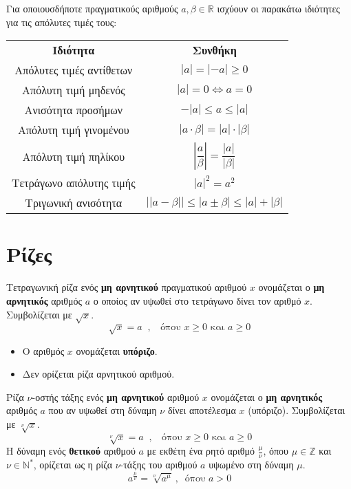 \thewrhmata
{}
Για οποιουσδήποτε πραγματικούς αριθμούς $ a,\beta\in\mathbb{R} $ ισχύουν οι παρακάτω ιδιότητες για τις απόλυτες τιμές τους:
\begin{center}
\begin{longtable}{cc}
\hline \rule[-2ex]{0pt}{5.5ex} \textbf{Ιδιότητα} & \textbf{Συνθήκη} \\
\hhline{==}\rule[-2ex]{0pt}{5.5ex} Απόλυτες τιμές αντίθετων & $ |a|=|-a|\geq0 $ \\
\rule[-2ex]{0pt}{5.5ex}  Απόλυτη τιμή μηδενός & $ |a|=0\Leftrightarrow a=0 $\\
\rule[-2ex]{0pt}{5.5ex}  Ανισότητα προσήμων & $ -|a|\leq a\leq|a| $ \\
\rule[-2ex]{0pt}{5.5ex}  Απόλυτη τιμή γινομένου & $ |a\cdot\beta|=|a|\cdot|\beta| $ \\
\rule[-2ex]{0pt}{5.5ex}  Απόλυτη τιμή πηλίκου & $ \left| \dfrac{a}{\beta}\right|=\dfrac{|a|}{|\beta|} $ \\
\rule[-2ex]{0pt}{5.5ex} Τετράγωνο απόλυτης τιμής & $ |a|^2=a^2 $ \\ 
\rule[-2ex]{0pt}{5.5ex} Τριγωνική ανισότητα & $ \left||a-\beta| \right|\leq|a\pm\beta|\leq|a|+|\beta|  $ \\
\hline
\end{longtable}\vspace{-4mm}
\end{center}
\Lymena
\section{Ρίζες}
\Thewria
\orismoi
{}
Τετραγωνική ρίζα ενός \textbf{μη αρνητικού} πραγματικού αριθμού $ x $ ονομάζεται ο \textbf{μη αρνητικός} αριθμός $ a $ ο οποίος αν υψωθεί στο τετράγωνο δίνει τον αριθμό $ x $. Συμβολίζεται με $ \sqrt{x} $.
\[ \sqrt{x}=a\;\;,\;\;\textrm{ όπου }x\geq0\textrm{ και }a\geq0 \]
\begin{itemize}[itemsep=0mm]
\item Ο αριθμός $ x $ ονομάζεται \textbf{υπόριζο}.
\item Δεν ορίζεται ρίζα αρνητικού αριθμού.
\end{itemize}
Ρίζα $ \nu $-οστής τάξης ενός \textbf{μη αρνητικού} αριθμού $ x $ ονομάζεται ο \textbf{μη αρνητικός} αριθμός $ a $ που αν υψωθεί στη δύναμη $ \nu $ δίνει αποτέλεσμα $ x $ (υπόριζο). Συμβολίζεται με $ \sqrt[\nu]{x} $.
\[ \sqrt[\nu]{x}=a\;\;,\;\;\textrm{ όπου }x\geq0\textrm{ και }a\geq0 \]
Η δύναμη ενός \textbf{θετικού} αριθμού $ a $ με εκθέτη ένα ρητό αριθμό $ \frac{\mu}{\nu} $, όπου $ \mu\in\mathbb{Z} $ και $ \nu\in\mathbb{N}^* $, ορίζεται ως η ρίζα $ \nu $-τάξης του αριθμού $ a $ υψωμένο στη δύναμη $ \mu $.
\[ a^{\frac{\mu}{\nu}}=\!\sqrt[\nu]{a^\mu}\ ,\ \textrm{ όπου } a>0 \]

